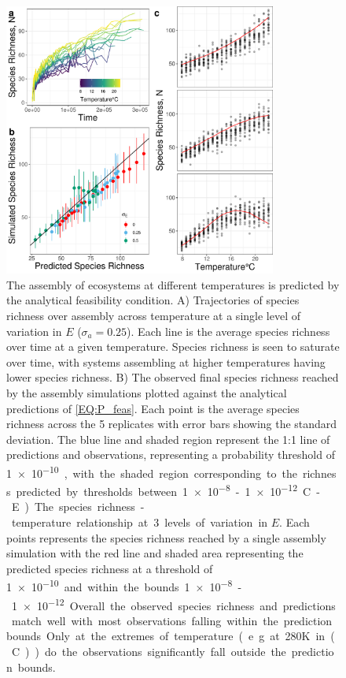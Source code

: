 \documentclass{article}
\begin{document}
\begin{figure}
    \centering
    \includegraphics[width = 0.8\textwidth]{docs/Figures/Fig_sim.pdf}
    \caption{The assembly of ecosystems at different temperatures is predicted by the analytical feasibility condition. A) Trajectories of species richness over assembly across temperature at a single level of variation in $E$ ($\sigma_a = 0.25$). Each line is the average species richness over time at a given temperature. Species richness is seen to saturate over time, with systems assembling at higher temperatures having lower species richness. B) The observed final species richness reached by the assembly simulations plotted against the analytical predictions of \cref{EQ:P_feas}. Each point is the average species richness across the 5 replicates with error bars showing the standard deviation. The blue line and shaded region represent the 1:1 line of predictions and observations, representing a probability threshold of \SI{1e-10}, with the shaded region corresponding to the richness predicted by thresholds between \SI{1e-8}-\SI{1e-12}. . C-E) The species richness - temperature relationship at 3 levels of variation in $E$. Each points represents the species richness reached by a single assembly simulation with the red line and shaded area representing the predicted species richness at a threshold of \SI{1e-10} and within the bounds \SI{1e-8}-\SI{1e-12}. Overall the observed species richness and predictions match well with most observations falling within the prediction bounds. Only at the extremes of temperature (e.g. at 280K in (C)) do the observations significantly fall outside the prediction bounds.}
    \label{Fig:Temperature_assembly}
\end{figure}
\end{document}
